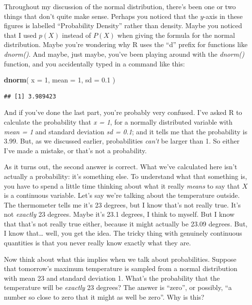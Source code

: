 \documentclass[
]{book}
\newenvironment{Shaded}{\begin{snugshade}}{\end{snugshade}}
\newcommand{\DataTypeTok}[1]{\textcolor[rgb]{0.13,0.29,0.53}{#1}}
\newcommand{\DecValTok}[1]{\textcolor[rgb]{0.00,0.00,0.81}{#1}}
\newcommand{\FloatTok}[1]{\textcolor[rgb]{0.00,0.00,0.81}{#1}}
\newcommand{\KeywordTok}[1]{\textcolor[rgb]{0.13,0.29,0.53}{\textbf{#1}}}
\newcommand{\NormalTok}[1]{#1}
\begin{document}
Throughout my discussion of the normal distribution, there's been one or two things that don't quite make sense. Perhaps you noticed that the \(y\)-axis in these figures is labelled ``Probability Density'' rather than density. Maybe you noticed that I used \(p(X)\) instead of \(P(X)\) when giving the formula for the normal distribution. Maybe you're wondering why R uses the ``d'' prefix for functions like \emph{dnorm()}. And maybe, just maybe, you've been playing around with the \emph{dnorm()} function, and you accidentally typed in a command like this:

\begin{Shaded}
\begin{Highlighting}[]
\KeywordTok{dnorm}\NormalTok{( }\DataTypeTok{x =} \DecValTok{1}\NormalTok{, }\DataTypeTok{mean =} \DecValTok{1}\NormalTok{, }\DataTypeTok{sd =} \FloatTok{0.1}\NormalTok{ )}
\end{Highlighting}
\end{Shaded}

\begin{verbatim}
## [1] 3.989423
\end{verbatim}

And if you've done the last part, you're probably very confused. I've asked R to calculate the probability that \emph{x = 1}, for a normally distributed variable with \emph{mean = 1} and standard deviation \emph{sd = 0.1}; and it tells me that the probability is 3.99. But, as we discussed earlier, probabilities \emph{can't} be larger than 1. So either I've made a mistake, or that's not a probability.

As it turns out, the second answer is correct. What we've calculated here isn't actually a probability: it's something else. To understand what that something is, you have to spend a little time thinking about what it really \emph{means} to say that \(X\) is a continuous variable. Let's say we're talking about the temperature outside. The thermometer tells me it's 23 degrees, but I know that's not really true. It's not \emph{exactly} 23 degrees. Maybe it's 23.1 degrees, I think to myself. But I know that that's not really true either, because it might actually be 23.09 degrees. But, I know that\ldots{} well, you get the idea. The tricky thing with genuinely continuous quantities is that you never really know exactly what they are.

Now think about what this implies when we talk about probabilities. Suppose that tomorrow's maximum temperature is sampled from a normal distribution with mean 23 and standard deviation 1. What's the probability that the temperature will be \emph{exactly} 23 degrees? The answer is ``zero'', or possibly, ``a number so close to zero that it might as well be zero''. Why is this?
\end{document}
